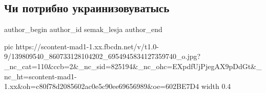  
 
 
 
 
\subsection{Чи потрибно украинизовуватысь}
\ifcmt
  author_begin
   author_id semak_lesja
  author_end
\fi

\ifcmt
  pic https://scontent-mad1-1.xx.fbcdn.net/v/t1.0-9/139809540_860733128104202_6954945834127359740_o.jpg?_nc_cat=110&ccb=2&_nc_sid=825194&_nc_ohc=EXpdfUjPjegAX9pDdGt&_nc_ht=scontent-mad1-1.xx&oh=c80f78d2085602ac0e5c90ee69656989&oe=602BE7D4
  width 0.4
\fi

